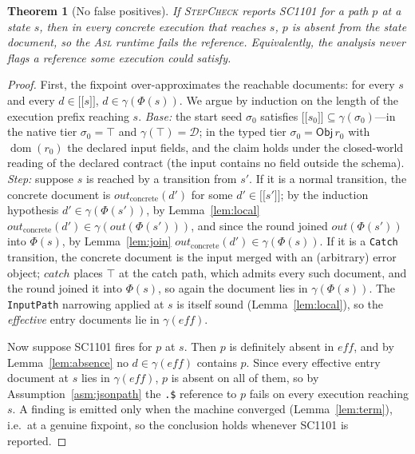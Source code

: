 \documentclass[11pt]{article}
\newcommand{\code}[1]{\textsf{\small #1}}
\newcommand{\tool}{\textsc{StepCheck}}
\newcommand{\asl}{\textsc{Asl}}
\newcommand{\dom}{\operatorname{dom}}
\newcommand{\Obj}{\mathsf{Obj}}
\newcommand{\eff}{\mathit{eff}}
\providecommand{\llbracket}{\mathopen{[\![}}
\providecommand{\rrbracket}{\mathclose{]\!]}}
\theoremstyle{plain}
\newtheorem{theorem}{Theorem}
\theoremstyle{definition}
\theoremstyle{remark}
\begin{document}
\begin{theorem}[No false positives]\label{thm:soundness}
If \tool{} reports \code{SC1101} for a path $p$ at a state $s$, then in every concrete
execution that reaches $s$, $p$ is absent from the state document, so the \asl{} runtime fails
the reference. Equivalently, the analysis never flags a reference some execution could satisfy.
\end{theorem}
\begin{proof}
First, the fixpoint over-approximates the reachable documents: for every $s$ and every
$d\in\llbracket s\rrbracket$, $d\in\gamma(\Phi(s))$. We argue by induction on the length of
the execution prefix reaching $s$. \emph{Base:} the start seed $\sigma_0$ satisfies
$\llbracket s_0\rrbracket\subseteq\gamma(\sigma_0)$---in the native tier $\sigma_0=\top$ and
$\gamma(\top)=\mathcal{D}$; in the typed tier $\sigma_0=\Obj\,r_0$ with $\dom(r_0)$ the
declared input fields, and the claim holds under the closed-world reading of the declared
contract (the input contains no field outside the schema). \emph{Step:} suppose $s$ is reached
by a transition from $s'$. If it is a normal transition, the concrete document is
$\mathit{out}_{\mathrm{concrete}}(d')$ for some $d'\in\llbracket s'\rrbracket$; by the
induction hypothesis $d'\in\gamma(\Phi(s'))$, by Lemma~\ref{lem:local}
$\mathit{out}_{\mathrm{concrete}}(d')\in\gamma(\mathit{out}(\Phi(s')))$, and since the round
joined $\mathit{out}(\Phi(s'))$ into $\Phi(s)$, by Lemma~\ref{lem:join}
$\mathit{out}_{\mathrm{concrete}}(d')\in\gamma(\Phi(s))$. If it is a \texttt{Catch}
transition, the concrete document is the input merged with an (arbitrary) error object;
$\mathit{catch}$ places $\top$ at the catch path, which admits every such document, and the
round joined it into $\Phi(s)$, so again the document lies in $\gamma(\Phi(s))$. The
\texttt{InputPath} narrowing applied at $s$ is itself sound (Lemma~\ref{lem:local}), so the
\emph{effective} entry documents lie in $\gamma(\eff)$.

Now suppose \code{SC1101} fires for $p$ at $s$. Then $p$ is definitely absent in $\eff$, and by
Lemma~\ref{lem:absence} no $d\in\gamma(\eff)$ contains $p$. Since every effective entry
document at $s$ lies in $\gamma(\eff)$, $p$ is absent on all of them, so by
Assumption~\ref{asm:jsonpath} the \texttt{.\$} reference to $p$ fails on every execution
reaching $s$. A finding is emitted only when the machine converged (Lemma~\ref{lem:term}),
i.e.\ at a genuine fixpoint, so the conclusion holds whenever \code{SC1101} is reported.
\end{proof}
\end{document}
